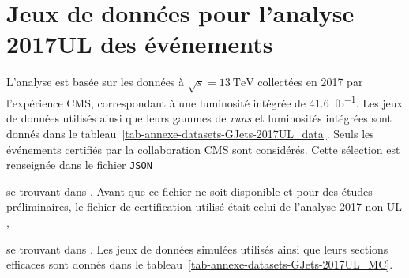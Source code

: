 \section{Jeux de données pour l'analyse 2017UL des événements \Gjets}
L'analyse est basée sur les données à $\sqrt{s}=\SI{13}{\TeV}$ collectées en 2017 par l'expérience CMS, correspondant à une luminosité intégrée de \SI{41.6}{\femto\barn^{-1}}.
Les jeux de données utilisés ainsi que leurs gammes de \emph{runs} et luminosités intégrées sont donnés dans le tableau~\ref{tab-annexe-datasets-GJets-2017UL_data}.
Seuls les événements certifiés par la collaboration CMS sont considérés. Cette sélection est renseignée dans le fichier \texttt{JSON}
\begin{center}
\end{center}
se trouvant dans .
Avant que ce fichier ne soit disponible et pour des études préliminaires, le fichier de certification utilisé était celui de l'analyse 2017 \og non UL \fg{},
\begin{center}
\end{center}
se trouvant dans .
Les jeux de données simulées utilisés ainsi que leurs sections efficaces sont donnés dans le tableau~\ref{tab-annexe-datasets-GJets-2017UL_MC}.

